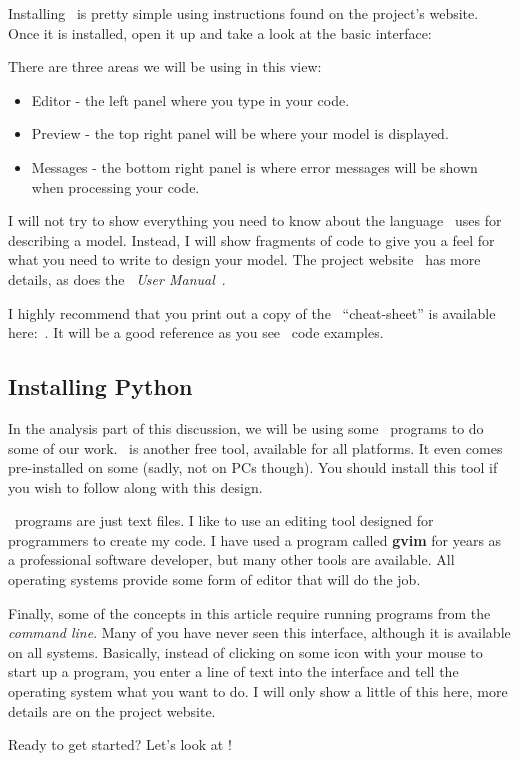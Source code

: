 Installing \osc\ is pretty simple using instructions found on the project's
website. Once it is installed, open it up and take a look at the basic
interface:


There are three areas we will be using in this view:

\begin{itemize}
\item{Editor - the left panel where you type in your code.}
\item{Preview - the top right panel will be where your model is displayed.}
\item{Messages - the bottom right panel is where error messages will be shown
when processing your code.}
\end{itemize}

I will not try to show everything you need to know about the language \osc\
uses for describing a model. Instead, I will show fragments of code to give you
a feel for what you need to write to design your model. The project
website~\cite{blackr} has more details, as does the \osc\ {\it User
Manual}~\cite{userman}.

I highly recommend that you  print out a copy of the \osc\
``cheat-sheet'' is available here:~\cite{osccheat}. It will be a good reference
as you see \osc\ code examples.

\subsection{Installing Python}

In the analysis part of this discussion, we will be using some \PY\ programs to
do some of our work. \PY\ is another free tool, available for all platforms. It
even comes pre-installed on some (sadly, not on PCs though). You should install
this tool if you wish to follow along with this design.

\PY\ programs are just text files. I like to use an editing tool designed for
programmers to create my code. I have used a program called {\bf gvim} for
years as a professional software developer, but many other tools are available.
All operating systems provide some form of editor that will do the job.

Finally, some of the concepts in this article require running programs from the
{\it command line}. Many of you have never seen this interface, although it is
available on all systems. Basically, instead of clicking on some icon with
your mouse to start up a program, you enter a line of text into the interface
and tell the operating system what you want to do. I will only show a little of
this  here, more details are on the project website.

Ready to get started? Let's look at \osc!



